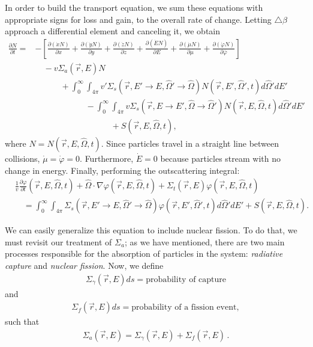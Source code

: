 \documentclass[12pt]{article}
\newcommand{\rvec}{\ensuremath{\vec{r}}}
\newcommand{\omvec}{\ensuremath{\hat{\Omega}}}
\begin{document}
 In order to build the transport equation, we sum these equations with appropriate signs
for loss and gain, to the overall rate of change. Letting $\triangle \beta$ approach a differential
element and canceling it, we obtain
\begin{align}
\frac{\partial N}{\partial t} =& -\left[\frac{\partial (\dot x N)}{\partial x} +
\frac{\partial (\dot y N)}{\partial y}+\frac{\partial (\dot z N)}{\partial z} +
\frac{\partial (\dot E N)}{\partial E}+\frac{\partial (\dot \mu N)}{\partial \mu}+
\frac{\partial (\dot \varphi N)}{\partial \overline\varphi}\right] 
\\ & \quad - v\Sigma_a(\rvec,E)N \nonumber
 \\& \quad\quad\quad   + 
\int_0^{\infty}\int_{4\pi}v'\Sigma_s(\rvec, E'\rightarrow E,\omvec'\rightarrow\omvec)N(\rvec,E',\omvec',t) d\omvec'dE'\nonumber 
\\& \quad\quad\quad\quad\quad\quad -\int_0^{\infty}\int_{4\pi}v\Sigma_s(\rvec, E\rightarrow E',\omvec\rightarrow\omvec')N(\rvec,E,\omvec,t) d\omvec'dE'\nonumber
\\& \quad\quad\quad\quad\quad\quad\quad\quad\quad
+S(\rvec,E,\omvec,t),\nonumber
\end{align}
 where $N = N(\rvec,E,\omvec,t)$. Since particles travel in a straight line
between collisions, \linebreak
$\dot \mu = \dot \varphi = 0$. Furthermore, $\dot E = 0$ because particles stream
with no change in energy. Finally, performing the outscattering integral:
\begin{align}
&\frac{1}{v}\frac{\partial \varphi}{\partial t}(\rvec,E,\omvec,t) + \omvec\cdot  \nabla \varphi(\rvec,E,\omvec,t) +
 \Sigma_t(\rvec,E)\varphi(\rvec,E,\omvec,t)
\\& \quad =
\int_0^{\infty}\int_{4\pi}\Sigma_s(\rvec, E'\rightarrow E,\omvec'\rightarrow\omvec)
\varphi(\rvec,E',\omvec',t)d\omvec'dE'+S(\rvec, E, \omvec,t) \nonumber.
\end{align}

We can easily generalize this equation to include nuclear fission.
To do that, we must revisit our treatment of $\Sigma_a$; as we have mentioned, there are two main processes responsible for the absorption of particles in the system: \textit{radiative capture} and \textit{nuclear fission}. Now, we define
\begin{align*}
\Sigma_\gamma(\rvec,E)ds = \textrm{probability of capture}
\end{align*}
and
\begin{align*}
\Sigma_f(\rvec,E)ds = \textrm{probability of a fission event},
\end{align*}
such that
\begin{align*}
\Sigma_a(\rvec,E) = \Sigma_\gamma(\rvec,E) + \Sigma_f(\rvec,E)\,.
\end{align*}
\end{document}

